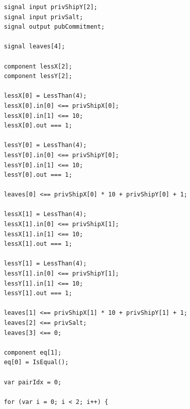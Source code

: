 \begin{listing}[H]
    \ContinuedFloat
    \begin{verbatim}
    signal input privShipY[2];
    signal input privSalt;
    signal output pubCommitment;

    signal leaves[4];

    component lessX[2];
    component lessY[2];

    lessX[0] = LessThan(4);
    lessX[0].in[0] <== privShipX[0];
    lessX[0].in[1] <== 10;
    lessX[0].out === 1;

    lessY[0] = LessThan(4);
    lessY[0].in[0] <== privShipY[0];
    lessY[0].in[1] <== 10;
    lessY[0].out === 1;

    leaves[0] <== privShipX[0] * 10 + privShipY[0] + 1;

    lessX[1] = LessThan(4);
    lessX[1].in[0] <== privShipX[1];
    lessX[1].in[1] <== 10;
    lessX[1].out === 1;

    lessY[1] = LessThan(4);
    lessY[1].in[0] <== privShipY[1];
    lessY[1].in[1] <== 10;
    lessY[1].out === 1;

    leaves[1] <== privShipX[1] * 10 + privShipY[1] + 1;
    leaves[2] <== privSalt;
    leaves[3] <== 0;

    component eq[1];
    eq[0] = IsEqual();

    var pairIdx = 0;

    for (var i = 0; i < 2; i++) {
    \end{verbatim}
    \caption{Merkle tree commitment for two coordinates (continued).}
    \label{lst:initialProofCircuitMerkleC}
\end{listing}

